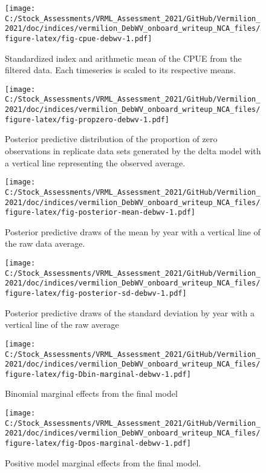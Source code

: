 \documentclass[
]{article}
\begin{document}
\begin{figure}
\centering
\texttt{[image: C:/Stock\_Assessments/VRML\_Assessment\_2021/GitHub/Vermilion\_2021/doc/indices/vermilion\_DebWV\_onboard\_writeup\_NCA\_files/figure-latex/fig-cpue-debwv-1.pdf]}
\caption{\label{fig:fig-cpue-debwv}Standardized index and arithmetic mean of the CPUE from the filtered data. Each timeseries is scaled to its respective means.}
\end{figure}

\begin{figure}
\centering
\texttt{[image: C:/Stock\_Assessments/VRML\_Assessment\_2021/GitHub/Vermilion\_2021/doc/indices/vermilion\_DebWV\_onboard\_writeup\_NCA\_files/figure-latex/fig-propzero-debwv-1.pdf]}
\caption{\label{fig:fig-propzero-debwv}Posterior predictive distribution of the proportion of zero observations in replicate data sets generated by the delta model with a vertical line representing the observed average.}
\end{figure}

\begin{figure}
\centering
\texttt{[image: C:/Stock\_Assessments/VRML\_Assessment\_2021/GitHub/Vermilion\_2021/doc/indices/vermilion\_DebWV\_onboard\_writeup\_NCA\_files/figure-latex/fig-posterior-mean-debwv-1.pdf]}
\caption{\label{fig:fig-posterior-mean-debwv}Posterior predictive draws of the mean by year with a vertical line of the raw data average.}
\end{figure}

\begin{figure}
\centering
\texttt{[image: C:/Stock\_Assessments/VRML\_Assessment\_2021/GitHub/Vermilion\_2021/doc/indices/vermilion\_DebWV\_onboard\_writeup\_NCA\_files/figure-latex/fig-posterior-sd-debwv-1.pdf]}
\caption{\label{fig:fig-posterior-sd-debwv}Posterior predictive draws of the standard deviation by year with a vertical line of the raw average}
\end{figure}

\begin{figure}
\centering
\texttt{[image: C:/Stock\_Assessments/VRML\_Assessment\_2021/GitHub/Vermilion\_2021/doc/indices/vermilion\_DebWV\_onboard\_writeup\_NCA\_files/figure-latex/fig-Dbin-marginal-debwv-1.pdf]}
\caption{\label{fig:fig-Dbin-marginal-debwv}Binomial marginal effects from the final model}
\end{figure}

\begin{figure}
\centering
\texttt{[image: C:/Stock\_Assessments/VRML\_Assessment\_2021/GitHub/Vermilion\_2021/doc/indices/vermilion\_DebWV\_onboard\_writeup\_NCA\_files/figure-latex/fig-Dpos-marginal-debwv-1.pdf]}
\caption{\label{fig:fig-Dpos-marginal-debwv}Positive model marginal effects from the final model.}
\end{figure}
\end{document}
